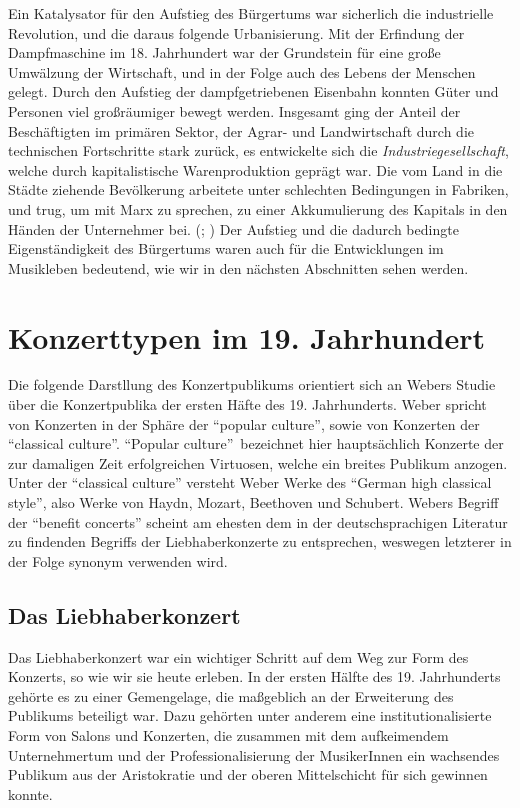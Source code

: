 \documentclass[a4paper, german, oneside]{scrbook}
\newcommand{\citep}[1]{\parencite{#1}}
\begin{document}
Ein Katalysator für den Aufstieg des Bürgertums war sicherlich die industrielle Revolution, und die daraus folgende Urbanisierung. Mit der Erfindung der Dampfmaschine im 18. Jahrhundert war der Grundstein für eine große Umwälzung der Wirtschaft, und in der Folge auch des Lebens der Menschen gelegt. Durch den Aufstieg der dampfgetriebenen Eisenbahn konnten Güter und Personen viel großräumiger bewegt werden. Insgesamt ging der Anteil der Beschäftigten im primären Sektor, der Agrar- und Landwirtschaft durch die technischen Fortschritte stark zurück, es entwickelte sich die \emph{Industriegesellschaft}, welche durch kapitalistische Warenproduktion geprägt war. Die vom Land in die Städte ziehende Bevölkerung arbeitete unter schlechten Bedingungen in Fabriken, und trug, um mit Marx zu sprechen, zu einer Akkumulierung des Kapitals in den Händen der Unternehmer bei. (\cite{marx_kapital:_1989}; \cite[368]{hillmann_worterbuch_2007}) Der Aufstieg und die dadurch bedingte Eigenständigkeit des Bürgertums waren auch für die Entwicklungen im Musikleben bedeutend, wie wir in den nächsten Abschnitten sehen werden.


\section{Konzerttypen im 19. Jahrhundert}
\label{konzerttypen}
Die folgende Darstllung des Konzertpublikums orientiert sich an Webers Studie über die Konzertpublika der ersten Häfte des 19. Jahrhunderts. \citep{weber_music_2004} Weber spricht von Konzerten in der Sphäre der \enquote{popular culture}, sowie von Konzerten der \enquote{classical culture}. \enquote{Popular culture} bezeichnet hier hauptsächlich Konzerte der zur damaligen Zeit erfolgreichen Virtuosen, welche ein breites Publikum anzogen. Unter der \enquote{classical culture} versteht Weber Werke des \enquote{German high classical style}, also Werke von Haydn, Mozart, Beethoven und Schubert. Webers Begriff der \enquote{benefit concerts} scheint am ehesten dem in der deutschsprachigen Literatur zu findenden Begriffs der Liebhaberkonzerte zu entsprechen, weswegen letzterer in der Folge synonym verwenden wird. \parencite[vgl.][21ff.]{weber_music_2004}


\subsection{Das Liebhaberkonzert}
\label{liebhaber}
Das Liebhaberkonzert war ein wichtiger Schritt auf dem Weg zur Form des Konzerts, so wie wir sie heute erleben. In der ersten Hälfte des 19. Jahrhunderts gehörte es zu einer Gemengelage, die maßgeblich an der Erweiterung des Publikums beteiligt war. Dazu gehörten unter anderem eine institutionalisierte Form von Salons und Konzerten, die zusammen mit dem aufkeimendem Unternehmertum und der Professionalisierung der MusikerInnen ein wachsendes Publikum aus der Aristokratie und der oberen Mittelschicht für sich gewinnen konnte.
\end{document}
